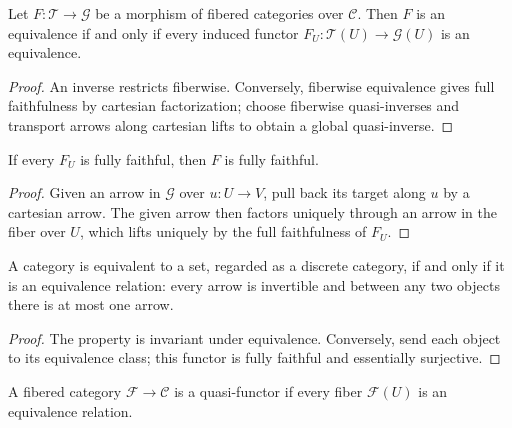 \begin{proposition}\label{fga-pro-3-36}\uses{}
Let $F:\mathcal T\to\mathcal G$ be a morphism of fibered categories over
$\mathcal C$.  Then $F$ is an equivalence if and only if every induced functor
$F_U:\mathcal T(U)\to\mathcal G(U)$ is an equivalence.
\end{proposition}
\begin{proof}
An inverse restricts fiberwise.  Conversely, fiberwise equivalence gives full
faithfulness by cartesian factorization; choose fiberwise quasi-inverses and
transport arrows along cartesian lifts to obtain a global quasi-inverse.
\end{proof}

\begin{lemma}\label{fga-lem-3-37}
If every $F_U$ is fully faithful, then $F$ is fully faithful.
\end{lemma}
\begin{proof}
Given an arrow in $\mathcal G$ over $u:U\to V$, pull back its target along
$u$ by a cartesian arrow.  The given arrow then factors uniquely through an
arrow in the fiber over $U$, which lifts uniquely by the full faithfulness of
$F_U$.
\end{proof}

\begin{proposition}\label{fga-pro-3-38}\uses{}
A category is equivalent to a set, regarded as a discrete category, if and only
if it is an equivalence relation: every arrow is invertible and between any two
objects there is at most one arrow.
\end{proposition}
\begin{proof}
The property is invariant under equivalence.  Conversely, send each object to
its equivalence class; this functor is fully faithful and essentially surjective.
\end{proof}

\begin{definition}\label{fga-def-3-39}
A fibered category $\mathcal F\to\mathcal C$ is a quasi-functor if every fiber
$\mathcal F(U)$ is an equivalence relation.
\end{definition}

